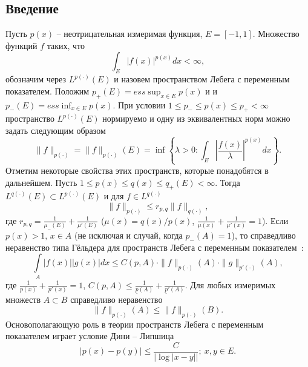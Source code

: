 \subsection{Введение}

Пусть $p(x)$ -- неотрицательная измеримая функция, $E=[-1,1]$. Множество функций $f$ таких, что
\begin{equation}\label{s2-lpx-def-1}
  \int_{E}|f(x)|^{p(x)}dx<\infty,
\end{equation}
обозначим через $L^{p(\cdot)}(E)$ и назовем пространством Лебега с переменным показателем. Положим $p_+(E)=ess\sup_{x\in E} p(x)$ и и $p_-(E)=ess\inf_{x\in E} p(x)$. При условии $1\le p_-\le p(x)\le p_+<\infty$ пространство $L^{p(\cdot)}(E)$ нормируемо \cite{tad-lpxtopology} и одну из эквивалентных норм можно задать следующим образом
\begin{equation}\label{s2-lpx-norm}
  \|f\|_{p(\cdot)}=\|f\|_{p(\cdot)}(E)=\inf\left\{\lambda>0:\int_{E}\left|\frac{f(x)}\lambda\right|^{p(x)}dx\right\}.
\end{equation}
Отметим некоторые свойства этих пространств, которые понадобятся в дальнейшем. Пусть $1\le p(x)\le q(x)\le q_+(E)<\infty$. Тогда \cite{tad-SHII-Haar} $L^{q(\cdot)}(E)\subset L^{p(\cdot)}(E)$ и для $f\in L^{q(\cdot)}$
\begin{equation}\label{LpxLqxNormIneq}
  \|f\|_{p(\cdot)}\le r_{p,q}\|f\|_{q(\cdot)},
\end{equation}
где $r_{p,q}=\frac1{\mu_-(E)}+\frac1{\mu'(E)}$ ($\mu(x)=q(x)/p(x)$, $\frac1{\mu(x)}+\frac1{\mu'(x)}=1$).
Если $p(x)>1,\, x \in A$ (не исключая и случай, когда $p_-(A)=1$), то справедливо неравенство типа Гёльдера для пространств Лебега с переменным показателем~\cite[нер-во (8)]{tad-lpxtopology}:
\begin{equation}\label{LpxHoelderIneq}
  \int\limits_A |f(x)||g(x)|dx \le
  C(p,A) \cdot \|f\|_{p(\cdot)}(A) \cdot \|g\|_{p'(\cdot)}(A),
\end{equation}
где $\frac{1}{p(x)}+\frac{1}{p'(x)}=1$, $C(p,A)\le \frac{1}{\underline{p}(A)}+\frac{1}{\underline{p}'(A)}$.
Для любых измеримых множеств $A\subset B$ справедливо неравенство
\begin{equation}\label{LpxNormSubsetIneq}
  \|f\|_{p(\cdot)}(A) \le \|f\|_{p(\cdot)}(B).
\end{equation}
Основополагающую роль в теории пространств Лебега с переменным показателем играет условие Дини -- Липшица
\begin{equation}\label{DiniLipCond}
	|p(x)-p(y)| \le \frac{C}{|\log |x-y||};\ x,y \in E.
\end{equation}


